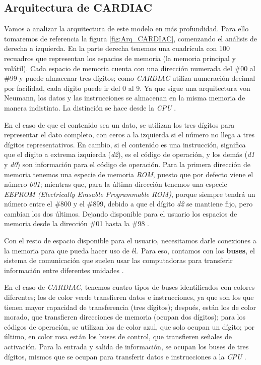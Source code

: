 \documentclass[letterpaper,12pt,oneside]{book}
\begin{document}
	\subsection{Arquitectura de CARDIAC}	
	
	Vamos a analizar la arquitectura de este modelo en más profundidad. Para ello tomaremos de referencia
	la 
	figura \ref{fig:Arq_CARDIAC}, comenzando el análisis de derecha a izquierda.
	En la parte
	derecha tenemos una cuadrícula con 100 recuadros que representan 
	los espacios de memoria (la memoria principal y volátil).
	Cada espacio de memoria cuenta con una dirección numerada del \#00 al \#99 
	y puede almacenar tres dígitos; como \textit{CARDIAC} utiliza
	numeración decimal por facilidad, cada dígito puede ir del 0 al 9. Ya que sigue una arquitectura
	 von Neumann, los datos
	y las instrucciones se almacenan en la misma memoria de manera indistinta. La distinción
	se hace desde la \textit{CPU} \cite{fingerman_instruction_1968}.
	
	En el caso de que el contenido sea un dato, se utilizan los tres dígitos 
	para representar el dato completo, con ceros a la 	
	izquierda si el número no llega a tres dígitos representativos. En cambio,
	si el contenido es una instrucción, significa que el dígito a extrema 
	izquierda (\textit{d2}),
	es el código de operación, y los demás (\textit{d1} y \textit{d0}) 
	son información para el código de operación. Para la primera dirección de memoria 
	tenemos una especie de memoria \textit{ROM}, puesto
	que por defecto viene el número \textit{001}; mientras que, para la última dirección
	tenemos una especie \textit{EEPROM (Electrically Erasable Programmable ROM)}, porque
	siempre tendrá un número entre el \#800 y el \#899, debido a que el dígito \textit{d2}
	se mantiene fijo, pero cambian los dos últimos. Dejando disponible
	 para el usuario los espacios de memoria desde la dirección
	 \#01 hasta la \#98 \cite{fingerman_instruction_1968}.
	
	Con el resto de espacio disponible para el usuario, necesitamos
	darle conexiones a la memoria para
	que pueda hacer uso de él. Para eso, contamos con los \textbf{buses},
	el sistema de comunicación que suelen
	usar las computadoras para transferir información entre diferentes unidades 
	\cite{fingerman_instruction_1968}.
 
    En el caso de \textit{CARDIAC}, tenemos cuatro tipos de buses
	identificados con colores diferentes; los de color verde transfieren datos e instrucciones, 
	ya que son los que tienen mayor
	capacidad de transferencia (tres dígitos); después, están los de color morado, que transfieren
	direcciones de memoria (ocupan dos dígitos);
	para los códigos de operación, se utilizan los de color azul, que solo ocupan un dígito;
	por último, en color rosa están los buses de control,
	que transfieren señales de activación. Para la entrada y salida de información,
	se ocupan los buses de tres dígitos, mismos que
	se ocupan para transferir datos e instrucciones a la \textit{CPU} \cite{fingerman_instruction_1968}.
	
\end{document}
